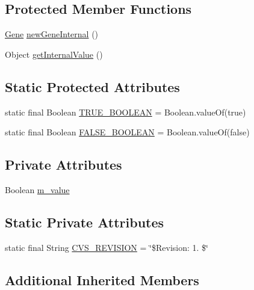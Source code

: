 \subsection*{Protected Member Functions}
\begin{DoxyCompactItemize}
\item 
\hyperlink{interfaceorg_1_1jgap_1_1_gene}{Gene} \hyperlink{classorg_1_1jgap_1_1impl_1_1_boolean_gene_a57df173aaf3d927451500893e5cccaf3}{new\-Gene\-Internal} ()
\item 
Object \hyperlink{classorg_1_1jgap_1_1impl_1_1_boolean_gene_ad1d9fb9f74b0905a92472f22050ab5b8}{get\-Internal\-Value} ()
\end{DoxyCompactItemize}
\subsection*{Static Protected Attributes}
\begin{DoxyCompactItemize}
\item 
static final Boolean \hyperlink{classorg_1_1jgap_1_1impl_1_1_boolean_gene_a1ac51ccfad17bf032f212248ab27c4d8}{T\-R\-U\-E\-\_\-\-B\-O\-O\-L\-E\-A\-N} = Boolean.\-value\-Of(true)
\item 
static final Boolean \hyperlink{classorg_1_1jgap_1_1impl_1_1_boolean_gene_ad70a1308d2e7b7872660808d59ca3332}{F\-A\-L\-S\-E\-\_\-\-B\-O\-O\-L\-E\-A\-N} = Boolean.\-value\-Of(false)
\end{DoxyCompactItemize}
\subsection*{Private Attributes}
\begin{DoxyCompactItemize}
\item 
Boolean \hyperlink{classorg_1_1jgap_1_1impl_1_1_boolean_gene_acd3b6512c17c7acf81b8d96a913d83cc}{m\-\_\-value}
\end{DoxyCompactItemize}
\subsection*{Static Private Attributes}
\begin{DoxyCompactItemize}
\item 
static final String \hyperlink{classorg_1_1jgap_1_1impl_1_1_boolean_gene_aeef14a51d83d4580e4adb0218fc51387}{C\-V\-S\-\_\-\-R\-E\-V\-I\-S\-I\-O\-N} = \char`\"{}\$Revision\-: 1. \$\char`\"{}
\end{DoxyCompactItemize}
\subsection*{Additional Inherited Members}


